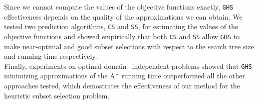 Since we cannot compute the values of the objective functions exactly, \texttt{GHS} effectiveness depends on the quality of the approximations we can obtain. We tested two prediction algorithms, \texttt{CS} and \texttt{SS}, for estimating the values of the objective functions and showed empirically that both \texttt{CS} and \texttt{SS} allow \texttt{GHS} to make near-optimal and good subset selections with respect to the search tree size and running time respectively.\\

Finally, experiments on optimal domain$-$independent problems showed that \texttt{GHS} minimizing approximations of the A$\sp{*}$ running time outperformed all the other approaches tested, which demostrates the effectiveness of our method for the heuristic subset selection problem.

\clearpage